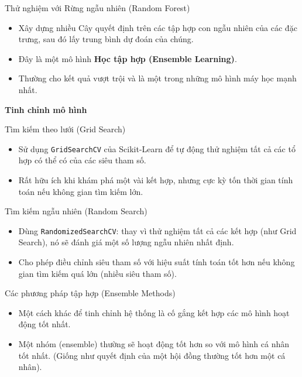 \documentclass[aspectratio=169]{beamer}
\begin{document}
\begin{frame}{Thử nghiệm với Rừng ngẫu nhiên (Random Forest)}
\begin{itemize}
    \item Xây dựng nhiều Cây quyết định trên các tập hợp con ngẫu nhiên của các đặc trưng, sau đó lấy trung bình dự đoán của chúng.
    \item Đây là một mô hình \textbf{Học tập hợp (Ensemble Learning)}.
    \item Thường cho kết quả vượt trội và là một trong những mô hình máy học mạnh nhất.
\end{itemize}
\end{frame}

\begin{frame}
\vfill\centering\LARGE\textbf{Tinh chỉnh mô hình}\vfill
\end{frame}

\begin{frame}{Tìm kiếm theo lưới (Grid Search)}
\begin{itemize}
    \item Sử dụng \texttt{GridSearchCV} của Scikit-Learn để tự động thử nghiệm tất cả các tổ hợp có thể có của các siêu tham số.
    \item Rất hữu ích khi khám phá một vài kết hợp, nhưng cực kỳ tốn thời gian tính toán nếu không gian tìm kiếm lớn.
\end{itemize}
\end{frame}

\begin{frame}{Tìm kiếm ngẫu nhiên (Random Search)}
\begin{itemize}
    \item Dùng \texttt{RandomizedSearchCV}: thay vì thử nghiệm tất cả các kết hợp (như Grid Search), nó sẽ đánh giá một số lượng ngẫu nhiên nhất định.
    \item Cho phép điều chỉnh siêu tham số với hiệu suất tính toán tốt hơn nếu không gian tìm kiếm quá lớn (nhiều siêu tham số).
\end{itemize}
\end{frame}

\begin{frame}{Các phương pháp tập hợp (Ensemble Methods)}
\begin{itemize}
    \item Một cách khác để tinh chỉnh hệ thống là cố gắng kết hợp các mô hình hoạt động tốt nhất.
    \item Một nhóm (ensemble) thường sẽ hoạt động tốt hơn so với mô hình cá nhân tốt nhất. (Giống như quyết định của một hội đồng thường tốt hơn một cá nhân).
\end{itemize}
\end{frame}
\end{document}

